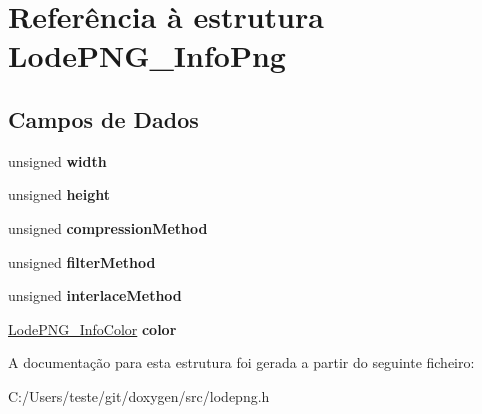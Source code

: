 \hypertarget{struct_lode_p_n_g___info_png}{\section{Referência à estrutura Lode\-P\-N\-G\-\_\-\-Info\-Png}
\label{struct_lode_p_n_g___info_png}
}
\subsection*{Campos de Dados}
\begin{DoxyCompactItemize}
\item 
\hypertarget{struct_lode_p_n_g___info_png_a7fa72fbc1c4226b0615406b9d8f540ed}{unsigned {\bfseries width}}\label{struct_lode_p_n_g___info_png_a7fa72fbc1c4226b0615406b9d8f540ed}

\item 
\hypertarget{struct_lode_p_n_g___info_png_aca36c0160c03c1526c37eb18fff3fe3d}{unsigned {\bfseries height}}\label{struct_lode_p_n_g___info_png_aca36c0160c03c1526c37eb18fff3fe3d}

\item 
\hypertarget{struct_lode_p_n_g___info_png_acc04cffbc39b26a9738dc41a64a5a0ce}{unsigned {\bfseries compression\-Method}}\label{struct_lode_p_n_g___info_png_acc04cffbc39b26a9738dc41a64a5a0ce}

\item 
\hypertarget{struct_lode_p_n_g___info_png_a060bebffd05950eadcfdf24cda3bcffa}{unsigned {\bfseries filter\-Method}}\label{struct_lode_p_n_g___info_png_a060bebffd05950eadcfdf24cda3bcffa}

\item 
\hypertarget{struct_lode_p_n_g___info_png_a916601748eacd64915b22838328ed5c5}{unsigned {\bfseries interlace\-Method}}\label{struct_lode_p_n_g___info_png_a916601748eacd64915b22838328ed5c5}

\item 
\hypertarget{struct_lode_p_n_g___info_png_aacf3bf4b386d02634eee23d7bf75bc5d}{\hyperlink{struct_lode_p_n_g___info_color}{Lode\-P\-N\-G\-\_\-\-Info\-Color} {\bfseries color}}\label{struct_lode_p_n_g___info_png_aacf3bf4b386d02634eee23d7bf75bc5d}

\end{DoxyCompactItemize}


A documentação para esta estrutura foi gerada a partir do seguinte ficheiro\-:\begin{DoxyCompactItemize}
\item 
C\-:/\-Users/teste/git/doxygen/src/lodepng.\-h\end{DoxyCompactItemize}
